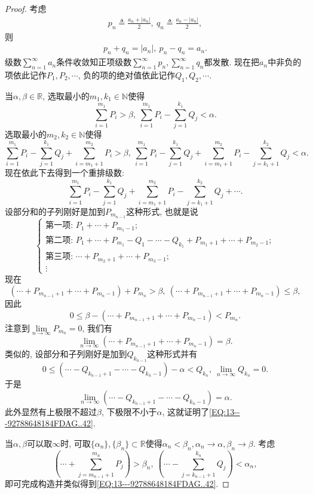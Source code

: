 \documentclass[../../main.tex]{subfiles}%
\begin{document}
\begin{proof}

考虑
\begin{align}\label{EQ:13---92788648184FDAG..43}
p_n\triangleq\frac{a_n+|a_n|}{2},\ q_n\triangleq\frac{a_n-|a_n|}{2},
\end{align}
则
\begin{align}\label{EQ:13---92788648184FDAG..44}
p_n+q_n=|a_n|,\ p_n-q_n=a_n.
\end{align}
级数$\sum\limits_{n=1}^{\infty}a_n$条件收敛知正项级数$\sum\limits_{n=1}^{\infty}p_n,\sum\limits_{n=1}^{\infty}q_n$都发散. 现在把$a_n$中非负的项依此记作$P_1,P_2,\cdots$, 负的项的绝对值依此记作$Q_1,Q_2,\cdots$.

当$\alpha,\beta\in\mathbb{R}$, 选取最小的$m_1,k_1\in\mathbb{N}$使得
$$\sum_{i=1}^{m_1}P_i>\beta,\ \sum_{i=1}^{m_1}P_i-\sum_{j=1}^{k_1}Q_j<\alpha.$$
选取最小的$m_2,k_2\in\mathbb{N}$使得
$$\sum_{i=1}^{m_1}P_i-\sum_{j=1}^{k_1}Q_j+\sum_{i=m_1+1}^{m_2}P_i>\beta,\ \sum_{i=1}^{m_1}P_i-\sum_{j=1}^{k_1}Q_j+\sum_{i=m_1+1}^{m_2}P_i-\sum_{j=k_1+1}^{k_2}Q_j<\alpha.$$
现在依此下去得到一个重排级数:
$$\sum_{i=1}^{m_1}P_i-\sum_{j=1}^{k_1}Q_j+\sum_{i=m_1+1}^{m_2}P_i-\sum_{j=k_1+1}^{k_2}Q_j+\cdots.$$
设部分和的子列刚好是加到$P_{m_{n-1}}$这种形式, 也就是说
$$
\begin{cases}
\text{第一项: } P_1+\cdots+P_{m_1-1}; \\
\text{第二项: } P_1+\cdots+P_{m_1}-Q_1-\cdots-Q_{k_1}+P_{m_1+1}+\cdots+P_{m_2-1}; \\
\text{第三项: } \cdots+P_{m_2+1}+\cdots+P_{m_3-1}; \\
\vdots
\end{cases}
$$
现在
$$(\cdots+P_{m_{n-1}+1}+\cdots+P_{m_n-1})+P_{m_n}>\beta,\ (\cdots+P_{m_{n-1}+1}+\cdots+P_{m_n-1})\leqslant\beta,$$
因此
$$0\leqslant\beta-(\cdots+P_{m_{n-1}+1}+\cdots+P_{m_n-1})<P_{m_n}.$$
注意到$\lim\limits_{n\to\infty}P_{m_n}=0$, 我们有
$$\lim\limits_{n\to\infty}(\cdots+P_{m_{n-1}+1}+\cdots+P_{m_n-1})=\beta.$$
类似的, 设部分和子列刚好是加到$Q_{k_{n-1}}$这种形式并有
$$0\leqslant(\cdots-Q_{k_{n-1}+1}-\cdots-Q_{k_n-1})-\alpha<Q_{k_n},\ \lim\limits_{n\to\infty}Q_{k_n}=0.$$
于是
$$\lim\limits_{n\to\infty}(\cdots-Q_{k_{n-1}+1}-\cdots-Q_{k_n-1})=\alpha.$$
此外显然有上极限不超过$\beta$, 下极限不小于$\alpha$, 这就证明了\eqref{EQ:13---92788648184FDAG..42}.

当$\alpha,\beta$可以取$\infty$时, 可取$\{\alpha_n\},\{\beta_n\}\subset\mathbb{R}$使得$\alpha_n<\beta_n,\alpha_n\to\alpha,\beta_n\to\beta$. 考虑
$$\left(\cdots+\sum_{j=m_{n-1}+1}^{m_n}P_j\right)>\beta_n,\ \left(\cdots-\sum_{j=k_{n-1}+1}^{k_n}Q_j\right)<\alpha_n,$$
即可完成构造并类似得到\eqref{EQ:13---92788648184FDAG..42}.

\end{proof}
\end{document}
